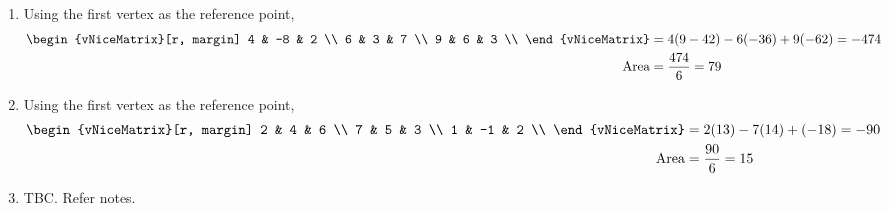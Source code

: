\begin{enumerate}
    \item Using the first vertex as the reference point,
          \begin{align}
              \begin{vNiceMatrix}[r, margin]
                  4 & -8 & 2 \\
                  6 & 3  & 7 \\
                  9 & 6  & 3 \\
              \end{vNiceMatrix} & = 4(9-42) - 6(-36) + 9(-62) = -474 \\
              \text{Area}                    & = \frac{474}{6} = 79
          \end{align}

    \item Using the first vertex as the reference point,
          \begin{align}
              \begin{vNiceMatrix}[r, margin]
                  2 & 4  & 6 \\
                  7 & 5  & 3 \\
                  1 & -1 & 2 \\
              \end{vNiceMatrix} & = 2(13) - 7(14) + (-18) = -90    \\
              \text{Area}                    & = \frac{90}{6} = 15
          \end{align}

    \item TBC. Refer notes.
\end{enumerate}